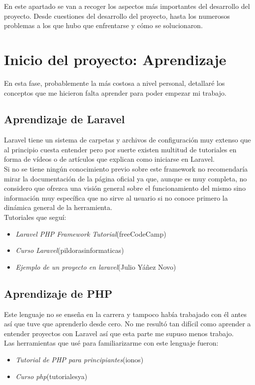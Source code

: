 En este apartado se van a recoger los aspectos más importantes del desarrollo del proyecto. Desde cuestiones del desarrollo del proyecto, hasta los numerosos problemas a los que hubo que enfrentarse y cómo se solucionaron.
\section{Inicio del proyecto: Aprendizaje}
En esta fase, probablemente la más costosa a nivel personal, detallaré los conceptos que me hicieron falta aprender para poder empezar mi trabajo.\\
\subsection{Aprendizaje de Laravel} 
Laravel tiene un sistema de carpetas y archivos de configuración muy extenso que al principio cuesta entender pero por suerte existen multitud de tutoriales en forma de vídeos o de artículos que explican como iniciarse en Laravel.\\
Si no se tiene ningún conocimiento previo sobre este framework no recomendaría mirar la documentación de la página oficial ya que, aunque es muy completa, no considero que ofrezca una visión general sobre el funcionamiento del mismo sino información muy específica que no sirve al usuario si no conoce primero la dinámica general de la herramienta.\\
Tutoriales que seguí:
\begin{itemize}
    \item \textit{Laravel PHP Framework Tutorial}(freeCodeCamp)\cite{TutorialLaravel}
    \item \textit{Curso Laravel}(pildorasinformaticas)\cite{TutorialLaravel2}
    \item \textit{Ejemplo de un proyecto en laravel}(Julio Yáñez Novo)\cite{PrimerProyecto}
\end{itemize}
\subsection{Aprendizaje de PHP} 
Este lenguaje no se enseña en la carrera y tampoco había trabajado con él antes así que tuve que aprenderlo desde cero. No me resultó tan difícil como aprender a entender proyectos con Laravel así que esta parte me supuso menos trabajo.\\
Las herramientas que usé para familiarizarme con este lenguaje fueron:
\begin{itemize}
    \item \textit{Tutorial de PHP para principiantes}(ionos)\cite{TutorialPHP}
    \item \textit{Curso php}(tutorialesya)\cite{CursoPHP} 
\end{itemize}
